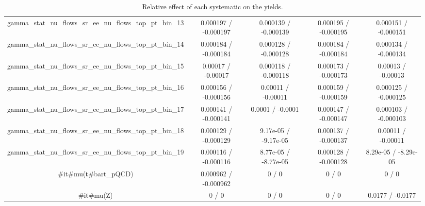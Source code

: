 \documentclass[10pt]{article}
\begin{document}
\begin{table}[htbp]
\begin{center}
\begin{tabular}{|c|c|c|c|c|}
  gamma_stat_nu_flows_sr_ee_nu_flows_top_pt_bin_13 & 0.000197 / -0.000197 & 0.000139 / -0.000139 & 0.000195 / -0.000195 & 0.000151 / -0.000151 \\ 
  gamma_stat_nu_flows_sr_ee_nu_flows_top_pt_bin_14 & 0.000184 / -0.000184 & 0.000128 / -0.000128 & 0.000184 / -0.000184 & 0.000134 / -0.000134 \\ 
  gamma_stat_nu_flows_sr_ee_nu_flows_top_pt_bin_15 & 0.00017 / -0.00017 & 0.000118 / -0.000118 & 0.000173 / -0.000173 & 0.00013 / -0.00013 \\ 
  gamma_stat_nu_flows_sr_ee_nu_flows_top_pt_bin_16 & 0.000156 / -0.000156 & 0.00011 / -0.00011 & 0.000159 / -0.000159 & 0.000125 / -0.000125 \\ 
  gamma_stat_nu_flows_sr_ee_nu_flows_top_pt_bin_17 & 0.000141 / -0.000141 & 0.0001 / -0.0001 & 0.000147 / -0.000147 & 0.000103 / -0.000103 \\ 
  gamma_stat_nu_flows_sr_ee_nu_flows_top_pt_bin_18 & 0.000129 / -0.000129 & 9.17e-05 / -9.17e-05 & 0.000137 / -0.000137 & 0.00011 / -0.00011 \\ 
  gamma_stat_nu_flows_sr_ee_nu_flows_top_pt_bin_19 & 0.000116 / -0.000116 & 8.77e-05 / -8.77e-05 & 0.000128 / -0.000128 & 8.29e-05 / -8.29e-05 \\ 
  #it{#mu}(t#bar{t}_{pQCD}) & 0.000962 / -0.000962 & 0 / 0 & 0 / 0 & 0 / 0 \\ 
  #it{#mu}(Z) & 0 / 0 & 0 / 0 & 0 / 0 & 0.0177 / -0.0177 \\ 
\hline 
\end{tabular} 
\caption{Relative effect of each systematic on the yields.} 
\end{center} 
\end{table} 
\end{document}
